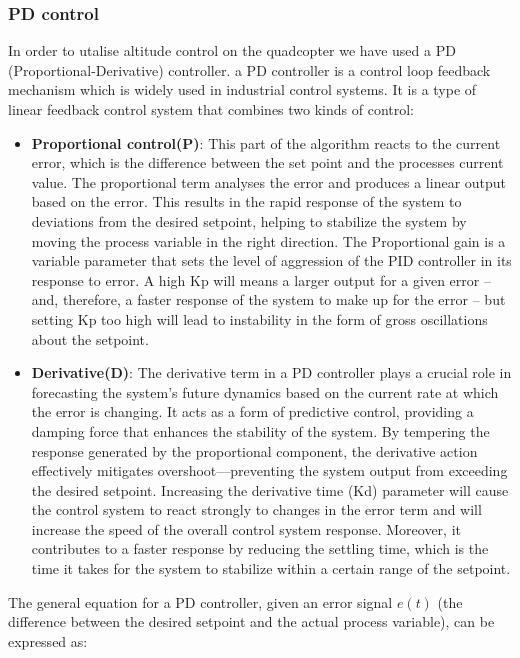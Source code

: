 \documentclass{article}
\begin{document}
\subsubsection{PD control}\label{PD_control}
In order to utalise altitude control on the quadcopter we have used a PD (Proportional-Derivative) controller. a PD controller is a control loop feedback mechanism which is widely used in industrial control systems. It is a type of linear feedback control system that combines two kinds of control:
\begin{itemize}
  \item \textbf{Proportional control(P)}: This part of the algorithm reacts to the current error, which is the difference between the set point and the processes current value. The proportional term analyses the error and produces a linear output based on the error. This results in the rapid 
  response of the system to deviations from the desired setpoint, helping to stabilize the system by moving the process variable in the right direction. The Proportional gain is a variable parameter that sets the level of aggression of the PID controller in its response to error. A high Kp will
  means a larger output for a given error – and, therefore, a faster response of the system to make up for the error – but setting Kp too high will lead to instability in the form of gross oscillations about the setpoint.
  \item \textbf{Derivative(D)}: The derivative term in a PD controller plays a crucial role in forecasting the system's future dynamics based on the current rate at which the error is changing. It acts as a form of predictive control, providing a damping force that enhances the stability of the system. 
  By tempering the response generated by the proportional component, the derivative action effectively mitigates overshoot—preventing the system output from exceeding the desired setpoint. Increasing the derivative time (Kd) parameter will cause the control system to react strongly to changes in the 
  error term and will increase the speed of the overall control system response. Moreover, it contributes to a faster response by reducing the settling time, which is the time it takes for the system to stabilize within a certain range of the setpoint.
\end{itemize}
The general equation for a PD controller, given an error signal \(e(t)\) (the difference between the desired setpoint and the actual process variable), can be expressed as:
\end{document}
